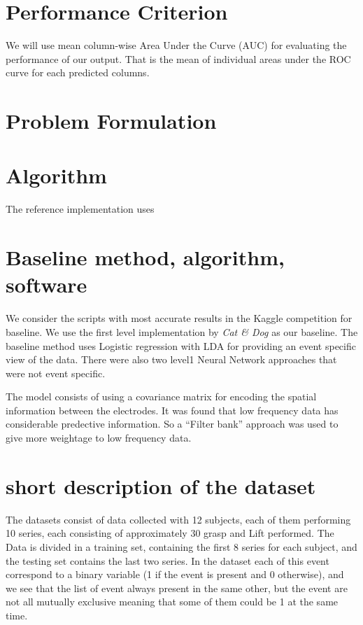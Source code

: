 \documentclass[final,leqno,onefignum,onetabnum]{siamltexmm}
\begin{document}
  \section{Performance Criterion}
  We will use mean column-wise Area Under the Curve (AUC) for evaluating the performance of our output.  That is the mean of individual areas under the ROC curve for each predicted columns.

  \section{Problem Formulation}

  \section{Algorithm}

  The reference implementation uses 


\section{Baseline method, algorithm, software}
We consider the scripts with most accurate results in the Kaggle competition for baseline\cite{kaggleleaderboard}.  We use the first level implementation by \textit{Cat \& Dog}\cite{kagglewinners} as our baseline.
The baseline method uses Logistic regression with LDA for providing an event specific view of the data.  There were also two level1 Neural Network approaches that were not event specific.

The model consists of using a covariance matrix for encoding the spatial information between the electrodes.  It was found that low frequency data has considerable predective information.  So a ``Filter bank'' approach was used to give more weightage to low frequency data.
 
\section{short description of the dataset}
The  datasets consist of data collected with 12 subjects, each of them performing 10 series, each consisting of approximately 30 grasp and Lift performed. The Data is divided in a  training set, containing the first 8 series for each subject, and  the testing set contains the last two series.
In the dataset each of this event correspond to a binary variable (1 if the event is present and 0 otherwise), and we see that the list of event always present in the same other, but the event are not all mutually exclusive meaning that some of  them could be 1 at the same time.  
\end{document}
